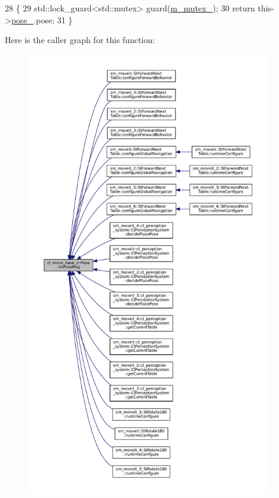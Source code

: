 \begin{DoxyCode}
28     \{
29         std::lock\_guard<std::mutex> guard(\hyperlink{classcl__move__base__z_1_1Pose_a73ed2daba3e473e156cab751fb37b58f}{m\_mutex\_});
30         \textcolor{keywordflow}{return} this->\hyperlink{classcl__move__base__z_1_1Pose_a9da7acf880968a3c220b8436fd0bb6ef}{pose\_}.pose;
31     \}
\end{DoxyCode}
Here is the caller graph for this function\+:
\nopagebreak
\begin{figure}[H]
\begin{center}
\leavevmode
\includegraphics[height=550pt]{classcl__move__base__z_1_1Pose_a9faf8c6b437ff6b19c8bddd692908dca_icgraph}
\end{center}
\end{figure}
\mbox{\label{classcl__move__base__z_1_1Pose_a63887a88c1ac6e9a4a71b8d7d11aed6c}} 
